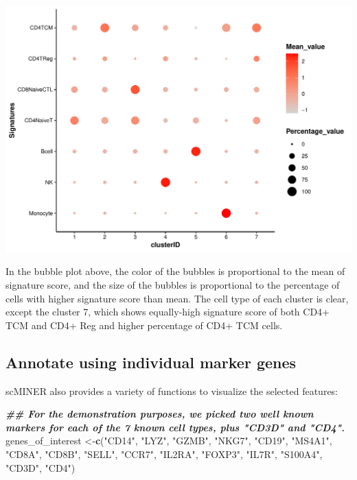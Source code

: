 \documentclass[
  12pt,
]{book}
\newenvironment{Shaded}{\begin{snugshade}}{\end{snugshade}}
\newcommand{\DocumentationTok}[1]{\textcolor[rgb]{0.56,0.35,0.01}{\textbf{\textit{#1}}}}
\newcommand{\FunctionTok}[1]{\textcolor[rgb]{0.13,0.29,0.53}{\textbf{#1}}}
\newcommand{\NormalTok}[1]{#1}
\newcommand{\OtherTok}[1]{\textcolor[rgb]{0.56,0.35,0.01}{#1}}
\newcommand{\StringTok}[1]{\textcolor[rgb]{0.31,0.60,0.02}{#1}}
\begin{document}
\begin{center}\includegraphics{_main_files/figure-latex/signature-bubble-1} \end{center}

In the bubble plot above, the color of the bubbles is proportional to the mean of signature score, and the size of the bubbles is proportional to the percentage of cells with higher signature score than mean. The cell type of each cluster is clear, except the cluster 7, which shows equally-high signature score of both CD4+ TCM and CD4+ Reg and higher percentage of CD4+ TCM cells.

\subsection{Annotate using individual marker genes}\label{annotate-using-individual-marker-genes}

scMINER also provides a variety of functions to visualize the selected features:

\begin{Shaded}
\begin{Highlighting}[]
\DocumentationTok{\#\# For the demonstration purposes, we picked two well known markers for each of the 7 known cell types, plus "CD3D" and "CD4".}
\NormalTok{genes\_of\_interest }\OtherTok{\textless{}{-}}\FunctionTok{c}\NormalTok{(}\StringTok{"CD14"}\NormalTok{, }\StringTok{"LYZ"}\NormalTok{, }\StringTok{"GZMB"}\NormalTok{, }\StringTok{"NKG7"}\NormalTok{, }\StringTok{"CD19"}\NormalTok{, }\StringTok{"MS4A1"}\NormalTok{, }\StringTok{"CD8A"}\NormalTok{, }\StringTok{"CD8B"}\NormalTok{, }\StringTok{"SELL"}\NormalTok{, }\StringTok{"CCR7"}\NormalTok{, }\StringTok{"IL2RA"}\NormalTok{, }\StringTok{"FOXP3"}\NormalTok{, }\StringTok{"IL7R"}\NormalTok{, }\StringTok{"S100A4"}\NormalTok{, }\StringTok{"CD3D"}\NormalTok{, }\StringTok{"CD4"}\NormalTok{)}
\end{Highlighting}
\end{Shaded}
\end{document}
